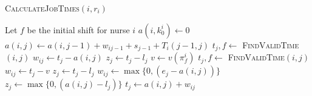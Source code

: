 \documentclass[a4paper,11pt,authoryear]{elsarticle}
\begin{document}
\begin{algorithm}[h]
\caption{\textsc{CalculateJobTimes}$(i, r_i)$}
\label{alg:shiftwork}
\begin{algorithmic}[1]
	\State Let $f$ be the initial shift for nurse $i$
	\State $a(i,k_{0}^i) \gets 0$
		\State $a(i,j) \gets a(i, j-1) + w_{ij-1} + s_{j-1} + T_i(j-1, j)$
			\State $t_j, f \gets$ \textsc{FindValidTime}$(i, j)$
			\State $w_{ij} \gets t_j - a(i,j)$
			\State $z_j \gets t_j - l_j$
			\State $v \gets v(\pi_{f}^{i})$
			\State $t_j, f \gets$ \textsc{FindValidTime}$(i,j)$
			\State $w_{ij} \gets t_j - v$
			\State $z_j \gets t_j - l_j$
		\Else
			\State $w_{ij} \gets \max\{0, (e_j-a(i,j))\}$
			\State $z_j \gets \max\{0, (a(i,j) - l_j)\}$
			\State $t_j \gets a(i,j) + w_{ij}$
		\EndIf
	\EndFor
\end{algorithmic}
\end{algorithm}
\end{document}
